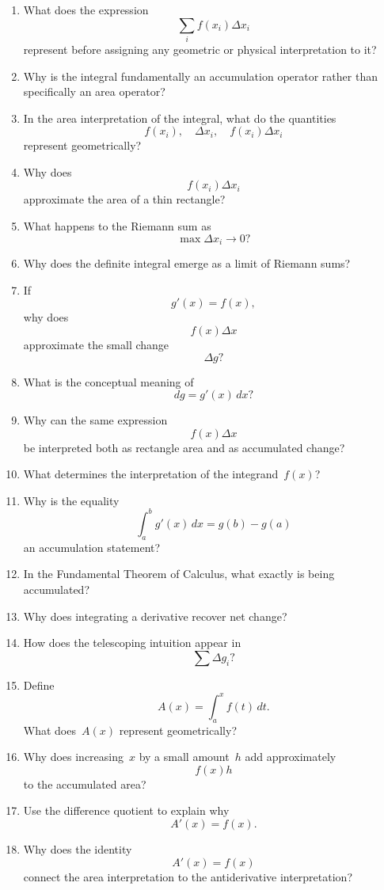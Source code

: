 \begin{enumerate}[resume]
  \item What does the expression
    \[ \sum_{i} f(x_{i})\Delta x_{i} \]
    represent before assigning any geometric or physical interpretation to it?
  \item Why is the integral fundamentally an accumulation operator rather than specifically an area operator?
  \item In the area interpretation of the integral, what do the quantities
    \[ f(x_{i}), \quad \Delta x_{i}, \quad f(x_{i})\Delta x_{i} \]
    represent geometrically?
  \item Why does
    \[ f(x_{i})\Delta x_{i} \]
    approximate the area of a thin rectangle?
  \item What happens to the Riemann sum as
    \[ \max \Delta x_{i} \to 0? \]
  \item Why does the definite integral emerge as a limit of Riemann sums?
  \item If
    \[ g'(x)=f(x), \]
    why does
    \[ f(x)\Delta x \]
    approximate the small change
    \[ \Delta g? \]
  \item What is the conceptual meaning of
    \[ dg = g'(x)\,dx? \]
  \item Why can the same expression
    \[ f(x)\Delta x \]
    be interpreted both as rectangle area and as accumulated change?
  \item What determines the interpretation of the integrand~\(f(x)\)?
  \item Why is the equality
    \[ \int_{a}^{b} g'(x)\,dx = g(b)-g(a) \]
    an accumulation statement?
  \item In the Fundamental Theorem of Calculus, what exactly is being accumulated?
  \item Why does integrating a derivative recover net change?
  \item How does the telescoping intuition appear in
    \[ \sum \Delta g_{i}? \]
  \item Define
    \[ A(x)=\int_{a}^{x} f(t)\,dt. \]
    What does~\(A(x)\) represent geometrically?
  \item Why does increasing~\(x\) by a small amount~\(h\) add approximately
    \[ f(x)h \]
    to the accumulated area?
  \item Use the difference quotient to explain why
    \[ A'(x)=f(x). \]
  \item Why does the identity
    \[ A'(x)=f(x) \]
    connect the area interpretation to the antiderivative interpretation?

\end{enumerate}
